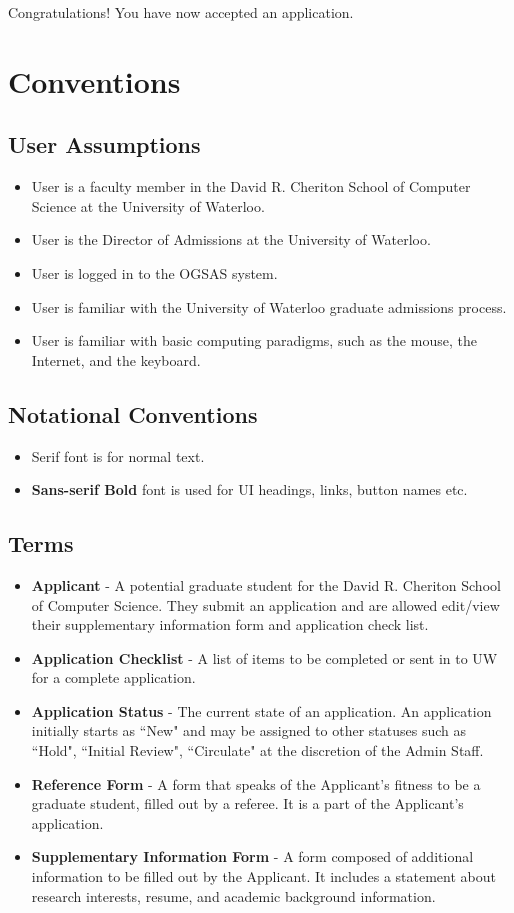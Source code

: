 \documentclass[titlepage]{article}
\begin{document}
Congratulations! You have now accepted an application.

\newpage
\section{Conventions}
\setcounter{figure}{0}

\subsection{User Assumptions}
\begin{itemize}
\item User is a faculty member in the David R. Cheriton School of Computer
  Science at the University of Waterloo.
\item User is the Director of Admissions at the University of Waterloo.
\item User is logged in to the OGSAS system.
\item User is familiar with the University of Waterloo graduate admissions
  process.
\item User is familiar with basic computing paradigms, such as the mouse, the
  Internet, and the keyboard.
\end{itemize}

\subsection{Notational Conventions}
\begin{itemize}
\item Serif font is for normal text.
\item \textbf{\textsf{Sans-serif Bold}} font is used for UI headings, links,
  button names etc.
\end{itemize}

\subsection{Terms}
\begin{itemize}
\item \textbf{Applicant} - A potential graduate student for the David R.
Cheriton School of Computer Science. They submit an application and are
allowed edit/view their supplementary information form and application check
list.
\item \textbf{Application Checklist} - A list of items to be completed or sent
in to UW for a complete application.
\item \textbf{Application Status} - The current state of an application. An
application initially starts as ``New" and may be assigned to other statuses
such as ``Hold", ``Initial Review", ``Circulate" at the discretion of the Admin
Staff.
\item \textbf{Reference Form} - A form that speaks of the Applicant's fitness
to be a graduate student, filled out by a referee. It is a part of the
Applicant's application.
\item \textbf{Supplementary Information Form} - A form composed of additional information
to be filled out by the Applicant.  It includes a statement about research
interests, resume, and academic background information.
\end{itemize}
\end{document}
